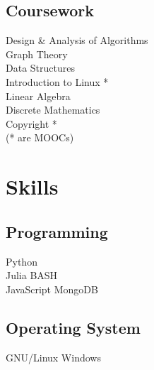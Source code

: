 \documentclass[]{deedy-resume-openfont}
\begin{document}
\begin{minipage}[t]{0.33\textwidth}


\subsection{Coursework}
Design \& Analysis of Algorithms \\
Graph Theory \\
Data Structures \\
Introduction to Linux {*}\\
Linear Algebra \\
Discrete Mathematics \\
Copyright {*}
\\
({*} are MOOCs)
\sectionsep


\section{Skills}
\subsection{Programming}
\textbullet{} Python \\
\textbullet{} Julia \textbullet{} BASH \\
\textbullet{} JavaScript \textbullet{} MongoDB \\
\subsection{Operating System}
\textbullet{} GNU/Linux \textbullet{} Windows

\end{minipage}
\end{document}

